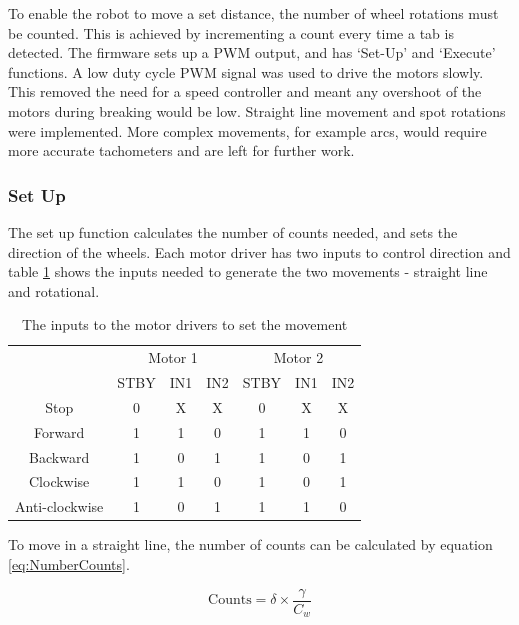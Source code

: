 To enable the robot to move a set distance, the number of wheel rotations must be counted. This is achieved by incrementing a count every time a tab is detected. The firmware sets up a PWM output, and has `Set-Up' and `Execute' functions. A low duty cycle PWM signal was used to drive the motors slowly. This removed the need for a speed controller and meant any overshoot of the motors during breaking would be low. Straight line movement and spot rotations were implemented. More complex movements, for example arcs, would require more accurate tachometers and are left for further work. %

\subsubsection{Set Up}
The set up function calculates the number of counts needed, and sets the direction of the wheels. Each motor driver has two inputs to control direction and table \ref{table:MotorDirection} shows the inputs needed to generate the two movements - straight line and rotational. 

\begin{table}
\centering
\caption{The inputs to the motor drivers to set the movement}
\label{table:MotorDirection}
\begin{tabular}{ccccccc}\toprule
\multicolumn{1}{c}{ }&\multicolumn{3}{c}{Motor 1}&\multicolumn{3}{c}{Motor 2}\\ \cmidrule(r){2-4} \cmidrule(l){5-7}
\multicolumn{1}{c}{ }	&	STBY 	&	IN1	& IN2 	& STBY 	& IN1 	& IN2	\\ \toprule
Stop					&	0		&	X	&	X	&	0	&	X	&	X	\\ \midrule
Forward					&	1		&	1	&	0	&	1	&	1	&	0	\\ \midrule
Backward				&	1		&	0	&	1	&	1	&	0	&	1	\\ \midrule
Clockwise				&	1		&	1	&	0	&	1	&	0	&	1	\\ \midrule
Anti-clockwise 			&	1		&	0	&	1	&	1	&	1	&	0	\\\bottomrule
\end{tabular}

\end{table}

To move in a straight line, the number of counts can be calculated by equation \eqref{eq:NumberCounts}. 

\begin{equation}
\label{eq:NumberCounts}
\text{Counts} = \delta \times \frac{\gamma}{C_w}
\end{equation}


